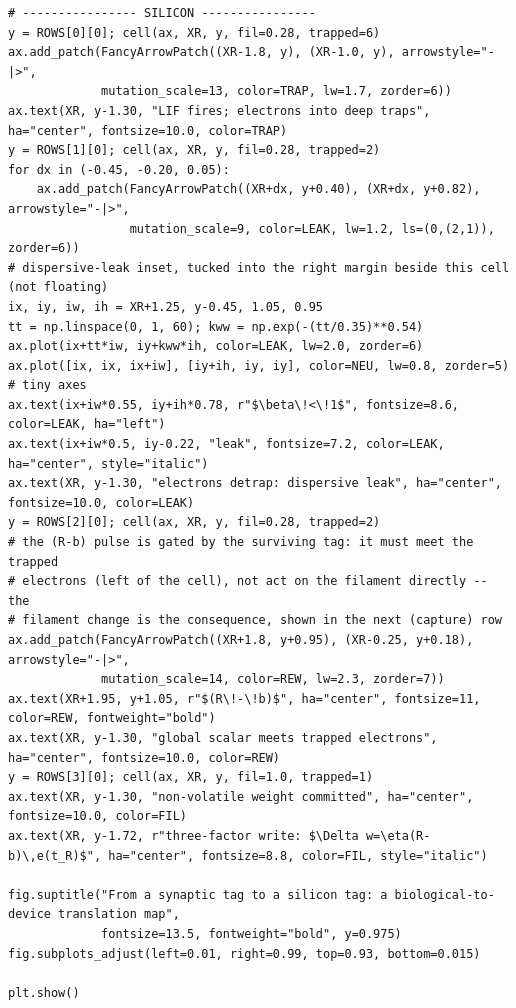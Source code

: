 \begin{lstlisting}[caption={schematics.ipynb code cell 5},label={lst:mrl-nb-schematics-5}]
# ---------------- SILICON ----------------
y = ROWS[0][0]; cell(ax, XR, y, fil=0.28, trapped=6)
ax.add_patch(FancyArrowPatch((XR-1.8, y), (XR-1.0, y), arrowstyle="-|>",
             mutation_scale=13, color=TRAP, lw=1.7, zorder=6))
ax.text(XR, y-1.30, "LIF fires; electrons into deep traps", ha="center", fontsize=10.0, color=TRAP)
y = ROWS[1][0]; cell(ax, XR, y, fil=0.28, trapped=2)
for dx in (-0.45, -0.20, 0.05):
    ax.add_patch(FancyArrowPatch((XR+dx, y+0.40), (XR+dx, y+0.82), arrowstyle="-|>",
                 mutation_scale=9, color=LEAK, lw=1.2, ls=(0,(2,1)), zorder=6))
# dispersive-leak inset, tucked into the right margin beside this cell (not floating)
ix, iy, iw, ih = XR+1.25, y-0.45, 1.05, 0.95
tt = np.linspace(0, 1, 60); kww = np.exp(-(tt/0.35)**0.54)
ax.plot(ix+tt*iw, iy+kww*ih, color=LEAK, lw=2.0, zorder=6)
ax.plot([ix, ix, ix+iw], [iy+ih, iy, iy], color=NEU, lw=0.8, zorder=5)   # tiny axes
ax.text(ix+iw*0.55, iy+ih*0.78, r"$\beta\!<\!1$", fontsize=8.6, color=LEAK, ha="left")
ax.text(ix+iw*0.5, iy-0.22, "leak", fontsize=7.2, color=LEAK, ha="center", style="italic")
ax.text(XR, y-1.30, "electrons detrap: dispersive leak", ha="center", fontsize=10.0, color=LEAK)
y = ROWS[2][0]; cell(ax, XR, y, fil=0.28, trapped=2)
# the (R-b) pulse is gated by the surviving tag: it must meet the trapped
# electrons (left of the cell), not act on the filament directly -- the
# filament change is the consequence, shown in the next (capture) row
ax.add_patch(FancyArrowPatch((XR+1.8, y+0.95), (XR-0.25, y+0.18), arrowstyle="-|>",
             mutation_scale=14, color=REW, lw=2.3, zorder=7))
ax.text(XR+1.95, y+1.05, r"$(R\!-\!b)$", ha="center", fontsize=11, color=REW, fontweight="bold")
ax.text(XR, y-1.30, "global scalar meets trapped electrons", ha="center", fontsize=10.0, color=REW)
y = ROWS[3][0]; cell(ax, XR, y, fil=1.0, trapped=1)
ax.text(XR, y-1.30, "non-volatile weight committed", ha="center", fontsize=10.0, color=FIL)
ax.text(XR, y-1.72, r"three-factor write: $\Delta w=\eta(R-b)\,e(t_R)$", ha="center", fontsize=8.8, color=FIL, style="italic")

fig.suptitle("From a synaptic tag to a silicon tag: a biological-to-device translation map",
             fontsize=13.5, fontweight="bold", y=0.975)
fig.subplots_adjust(left=0.01, right=0.99, top=0.93, bottom=0.015)

plt.show()
\end{lstlisting}

